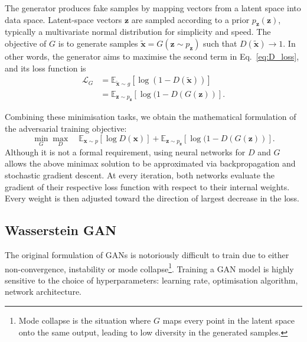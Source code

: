 The generator produces fake samples by mapping vectors from a latent space into data space. Latent-space vectors $\mathbf{z}$ are sampled according to a prior $p_\mathbf{z}(\mathbf{z})$, typically a multivariate normal distribution for simplicity and speed. The objective of $G$ is to generate samples $\tilde{\mathbf{x}} = G(\mathbf{z} \sim p_\mathbf{z})$ such that $D(\tilde{\mathbf{x}}) \rightarrow 1$. In other words, the generator aims to maximise the second term in Eq.~\ref{eq:D_loss}, and its loss function is
\begin{align}\label{eq:GAN_gen}
    \mathcal{L}_G &=     
    \mathbb{E}_{\tilde{\mathbf{x}} \sim g} [ \log( 1 - D(\tilde{\mathbf{x}}) )]\nonumber\\
    &= \mathbb{E}_{\mathbf{z} \sim p_\mathbf{z}} [ \log( 1 - D(G(\mathbf{z}) )].
\end{align}

Combining these minimisation tasks, we obtain the mathematical formulation of the adversarial training objective:
\begin{equation}\label{eq:GAN}
    \min_G \max_D \quad
    \mathbb{E}_{\mathbf{x} \sim p} [ \log D(\mathbf{x}) ] +
    \mathbb{E}_{\mathbf{z} \sim p_\mathbf{z}} [ \log( 1 - D(G(\mathbf{z}) )].
\end{equation}
Although it is not a formal requirement, using neural networks for $D$ and $G$ allows the above minimax solution to be approximated via backpropagation and stochastic gradient descent. At every iteration, both networks evaluate the gradient of their respective loss function with respect to their internal weights. Every weight is then adjusted toward the direction of largest decrease in the loss.


\subsection{Wasserstein GAN}
The original formulation of GANs is notoriously difficult to train due to either non-convergence, instability or mode collapse\footnote{Mode collapse is the situation where $G$ maps every point in the latent space onto the same output, leading to low diversity in the generated samples.}. 
Training a GAN model is highly sensitive to the choice of hyperparameters: learning rate, optimisation algorithm, network architecture. 

